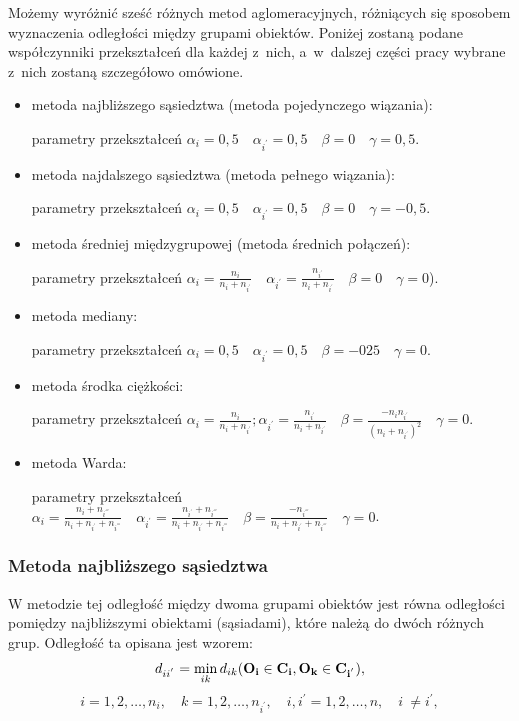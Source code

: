 \documentclass[12pt,a4paper]{report}
\begin{document}
Możemy wyróżnić sześć różnych metod aglomeracyjnych, różniących się sposobem wyznaczenia odległości między grupami obiektów. Poniżej zostaną podane współczynniki przekształceń dla każdej z~nich, a~w~dalszej części pracy wybrane z~nich zostaną szczegółowo omówione.
\begin{itemize}
\item metoda najbliższego sąsiedztwa (metoda pojedynczego wiązania):

parametry  przekształceń $\alpha_{i}=0,5 \quad \alpha_{i^{'}}=0,5 \quad  \beta=0 \quad \gamma=0,5$.
\item metoda najdalszego sąsiedztwa (metoda pełnego wiązania):

parametry  przekształceń $\alpha_{i}=0,5 \quad \alpha_{i^{'}}=0,5 \quad \beta=0 \quad \gamma=-0,5$.
\item metoda średniej międzygrupowej (metoda średnich połączeń):

parametry  przekształceń $\alpha_{i}=\frac{n_{i}}{n_{i} + n_{i^{'}}} \quad \alpha_{i^{'}}=\frac{n_{i^{'}}}{n_{i} + n_{i^{'}}} \quad \beta=0 \quad \gamma=0$).
\item metoda mediany:

parametry  przekształceń $\alpha_{i}=0,5 \quad \alpha_{i^{'}}=0,5 \quad \beta=-025 \quad \gamma=0$.
\item metoda środka ciężkości:

parametry  przekształceń $\alpha_{i}=\frac{n_{i}}{n_{i} + n_{i^{'}}}; \alpha_{i^{'}}=\frac{n_{i^{'}}}{n_{i} + n_{i^{'}}} \quad \beta=\frac{-n_{i}n_{i^{'}}}{(n_{i} + n_{i^{'}})^{2}} \quad \gamma=0$.
\item metoda Warda:

parametry  przekształceń $\alpha_{i}=\frac{n_{i}+n_{i^{'''}}}{n_{i} + n_{i^{'}}+n_{i^{'''}}} \quad \alpha_{i^{'}}=\frac{n_{i^{'}}+n_{i^{'''}}}{n_{i} + n_{i^{'}}+n_{i^{'''}}} \quad \beta=\frac{-n_{i^{'''}}}{n_{i} + n_{i^{'}}+n_{i^{'''}}} \quad \gamma=0$.

\end{itemize}
 
\subsubsection{Metoda najbliższego sąsiedztwa}


W metodzie tej odległość między dwoma grupami obiektów jest równa odległości pomiędzy najbliższymi obiektami (sąsiadami), które należą do dwóch różnych grup. Odległość ta opisana jest wzorem:
$$
d_{ii^{'}}= \min\limits_{ik} {d_{ik}(\bf{O_i} \in C_{i}, O_{k} \in C_{i^{'}})},
$$
$$
i=1,2,\dots,n_{i}, \quad k=1,2,\dots,n_{i^{'}}, \quad i,i^{'}=1,2,\dots,n, \quad i~\neq i^{'}, 
$$
\end{document}
